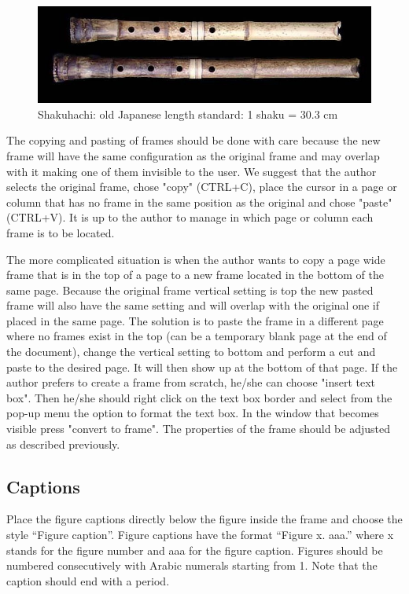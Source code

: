 \documentclass[10pt]{imeko_acta}
\begin{document}
\begin{figure}[!b]
	\centering
	\includegraphics[width=.9\linewidth]{wide_image}
	\caption{Shakuhachi: old Japanese length standard: 1 shaku = 30.3 cm}
	\label{fig:wideimage}
\end{figure}

The copying and pasting of frames should be done with care because the new frame will have the same configuration as the original frame and may overlap with it making one of them invisible to the user. We suggest that the author selects the original frame, chose "copy" (CTRL+C), place the cursor in a page or column that has no frame in the same position as the original and chose "paste" (CTRL+V). It is up to the author to manage in which page or column each frame is to be located.

The more complicated situation is when the author wants to copy a page wide frame that is in the top of a page to a new frame located in the bottom of the same page. Because the original frame vertical setting is top the new pasted frame will also have the same setting and will overlap with the original one if placed in the same page. The solution is to paste the frame in a different page where no frames exist in the top (can be a temporary blank page at the end of the document), change the vertical setting to bottom and perform a cut and paste to the desired page. It will then show up at the bottom of that page.
If the author prefers to create a frame from scratch, he/she can choose "insert text box". Then he/she should right click on the text box border and select from the pop-up menu the option to format the text box. In the window that becomes visible press "convert to frame". The properties of the frame should be adjusted as described previously.




\subsection{Captions}

Place the figure captions directly below the figure inside the frame and choose the style “Figure caption”. Figure captions have the format “Figure x. aaa.” where x stands for the figure number and aaa for the figure caption. Figures should be numbered consecutively with Arabic numerals starting from 1. Note that the caption should end with a period. 
\end{document}
